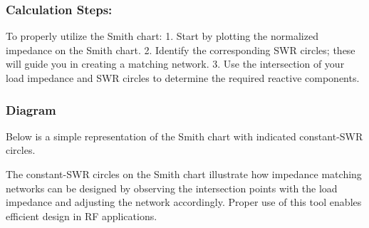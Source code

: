 \subsubsection*{Calculation Steps:}
To properly utilize the Smith chart:
1. Start by plotting the normalized impedance on the Smith chart.
2. Identify the corresponding SWR circles; these will guide you in creating a matching network.
3. Use the intersection of your load impedance and SWR circles to determine the required reactive components.

\subsubsection{Diagram}
Below is a simple representation of the Smith chart with indicated constant-SWR circles.

\begin{center}
\end{center}

The constant-SWR circles on the Smith chart illustrate how impedance matching networks can be designed by observing the intersection points with the load impedance and adjusting the network accordingly. Proper use of this tool enables efficient design in RF applications.
